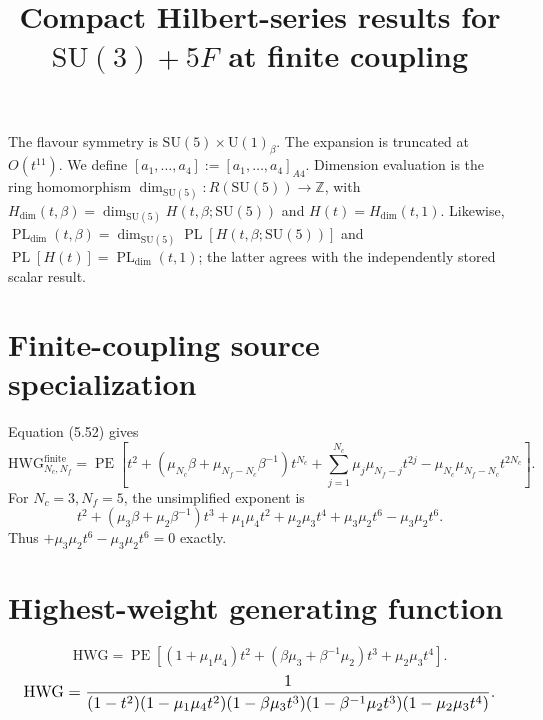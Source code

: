\documentclass[10pt]{article}
\title{Compact Hilbert-series results for $\mathrm{SU(3)}+5F$ at finite coupling}
\date{}
\newcommand{\PE}{\operatorname{PE}}
\begin{document}
\maketitle
The flavour symmetry is $\mathrm{SU}(5)\times\mathrm{U}(1)_{\beta}$.
The expansion is truncated at $O(t^{11})$.  We define
$[a_1,\ldots,a_{4}]:=[a_1,\ldots,a_{4}]_{A4}$.
Dimension evaluation is the ring homomorphism
$\dim_{\mathrm{SU}(5)}:R(\mathrm{SU}(5))\to\mathbb{Z}$, with
$H_{\mathrm{dim}}(t,\beta)=\dim_{\mathrm{SU}(5)}H(t,\beta;\mathrm{SU}(5))$
and $H(t)=H_{\mathrm{dim}}(t,1)$. Likewise,
$\operatorname{PL}_{\mathrm{dim}}(t,\beta)=\dim_{\mathrm{SU}(5)}
\operatorname{PL}[H(t,\beta;\mathrm{SU}(5))]$ and
$\operatorname{PL}[H(t)]=\operatorname{PL}_{\mathrm{dim}}(t,1)$;
the latter agrees with the independently stored scalar result.
\section{Finite-coupling source specialization}
Equation (5.52) gives
\[\mathrm{HWG}^{\mathrm{finite}}_{N_c,N_f}=\PE\!\left[t^2+(\mu_{N_c}\beta+\mu_{N_f-N_c}\beta^{-1})t^{N_c}+\sum_{j=1}^{N_c}\mu_j\mu_{N_f-j}t^{2j}-\mu_{N_c}\mu_{N_f-N_c}t^{2N_c}\right].\]
For $N_c=3,N_f=5$, the unsimplified exponent is
\[t^2+(\mu_3\beta+\mu_2\beta^{-1})t^3+\mu_1\mu_4t^2+\mu_2\mu_3t^4+\mu_3\mu_2t^6-\mu_3\mu_2t^6.\]
Thus $+\mu_3\mu_2t^6-\mu_3\mu_2t^6=0$ exactly.


\section{Highest-weight generating function}
\begin{equation}
\mathrm{HWG}=\PE\!\left[(1+\mu_1\mu_4)t^2
+(\beta\mu_3+\beta^{-1}\mu_2)t^3+\mu_2\mu_3t^4\right].
\end{equation}
\begin{equation}
\resizebox{0.98\linewidth}{!}{${\displaystyle
\mathrm{HWG}=\frac{1}{(1-t^2)(1-\mu_1\mu_4t^2)(1-\beta\mu_3t^3)
(1-\beta^{-1}\mu_2t^3)(1-\mu_2\mu_3t^4)}.}$}
\end{equation}
\end{document}
